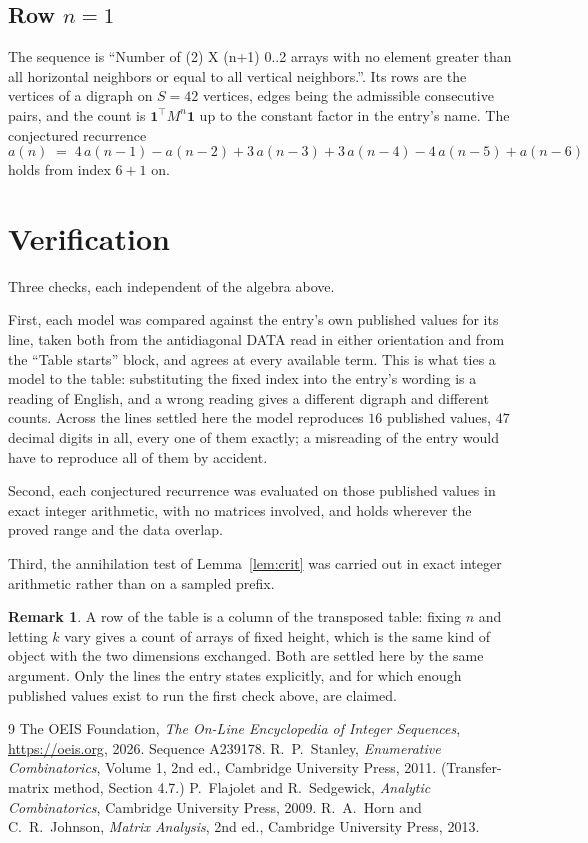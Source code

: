 \documentclass[11pt,a4paper]{article}
\theoremstyle{plain}
\theoremstyle{definition}
\newtheorem{remark}[theorem]{Remark}
\begin{document}
\subsection*{Row $n$$=1$}
The sequence is ``Number of (2) X (n+1) 0..2 arrays with no element greater than all horizontal neighbors or equal to all vertical neighbors.''. Its rows are the vertices of a digraph on
$S=42$ vertices, edges being the admissible consecutive pairs, and the count is
$\mathbf{1}^{\!\top}M^{n}\mathbf{1}$ up to the constant factor in the entry's name.
The conjectured recurrence
\[
a(n)\;=\;4\,a(n-1) - a(n-2) + 3\,a(n-3) + 3\,a(n-4) - 4\,a(n-5) + a(n-6)
\]
holds from index $6+1$ on.

\section{Verification}

Three checks, each independent of the algebra above.

First, each model was compared against the entry's own published values for its line, taken
both from the antidiagonal DATA read in either orientation and from the ``Table starts''
block, and agrees at every available term. This is what ties a model to the table:
substituting the fixed index into the entry's wording is a reading of English, and a wrong
reading gives a different digraph and different counts. Across the lines settled here the
model reproduces $16$ published values, $47$ decimal digits in all, every one of
them exactly; a misreading of the entry would have to reproduce all of them by accident.

Second, each conjectured recurrence was evaluated on those published values in exact
integer arithmetic, with no matrices involved, and holds wherever the proved range and the
data overlap.

Third, the annihilation test of Lemma~\ref{lem:crit} was carried out in exact integer
arithmetic rather than on a sampled prefix.

\begin{remark}
A row of the table is a column of the transposed table: fixing $n$ and letting $k$ vary gives a
count of arrays of fixed height, which is the same kind of object with the two dimensions
exchanged. Both are settled here by the same argument. Only the lines the entry states
explicitly, and for which enough published values exist to run the first check above, are
claimed.
\end{remark}

\begin{thebibliography}{9}
 The OEIS Foundation, \emph{The On-Line Encyclopedia of Integer
Sequences}, \url{https://oeis.org}, 2026. Sequence A239178.
 R.~P.~Stanley, \emph{Enumerative Combinatorics}, Volume 1, 2nd ed.,
Cambridge University Press, 2011. (Transfer-matrix method, Section 4.7.)
 P.~Flajolet and R.~Sedgewick, \emph{Analytic Combinatorics}, Cambridge
University Press, 2009.
 R.~A.~Horn and C.~R.~Johnson, \emph{Matrix Analysis}, 2nd ed., Cambridge
University Press, 2013.
\end{thebibliography}
\end{document}
